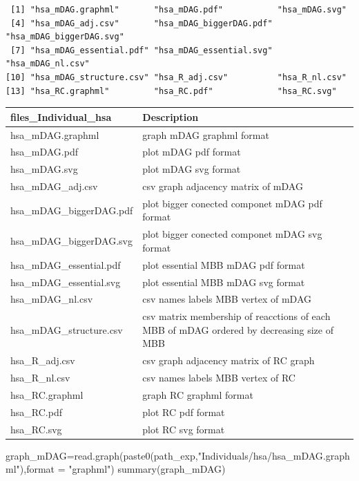\documentclass[
  letterpaper,
  DIV=11,
  numbers=noendperiod]{scrreprt}
\newenvironment{Shaded}{\begin{snugshade}}{\end{snugshade}}
\newcommand{\AttributeTok}[1]{\textcolor[rgb]{0.40,0.45,0.13}{#1}}
\newcommand{\FunctionTok}[1]{\textcolor[rgb]{0.28,0.35,0.67}{#1}}
\newcommand{\NormalTok}[1]{\textcolor[rgb]{0.00,0.23,0.31}{#1}}
\newcommand{\OtherTok}[1]{\textcolor[rgb]{0.00,0.23,0.31}{#1}}
\newcommand{\StringTok}[1]{\textcolor[rgb]{0.13,0.47,0.30}{#1}}
\begin{document}
\begin{verbatim}
 [1] "hsa_mDAG.graphml"       "hsa_mDAG.pdf"           "hsa_mDAG.svg"          
 [4] "hsa_mDAG_adj.csv"       "hsa_mDAG_biggerDAG.pdf" "hsa_mDAG_biggerDAG.svg"
 [7] "hsa_mDAG_essential.pdf" "hsa_mDAG_essential.svg" "hsa_mDAG_nl.csv"       
[10] "hsa_mDAG_structure.csv" "hsa_R_adj.csv"          "hsa_R_nl.csv"          
[13] "hsa_RC.graphml"         "hsa_RC.pdf"             "hsa_RC.svg"            
\end{verbatim}

\begin{tabular}{l|l}
\hline
files\_Individual\_hsa & Description\\
\hline
hsa\_mDAG.graphml & graph mDAG graphml format\\
\hline
hsa\_mDAG.pdf & plot mDAG pdf format\\
\hline
hsa\_mDAG.svg & plot mDAG svg format\\
\hline
hsa\_mDAG\_adj.csv & csv graph adjacency matrix of mDAG\\
\hline
hsa\_mDAG\_biggerDAG.pdf & plot bigger conected componet mDAG pdf format\\
\hline
hsa\_mDAG\_biggerDAG.svg & plot bigger conected componet mDAG svg format\\
\hline
hsa\_mDAG\_essential.pdf & plot essential MBB mDAG pdf format\\
\hline
hsa\_mDAG\_essential.svg & plot essential MBB mDAG svg format\\
\hline
hsa\_mDAG\_nl.csv & csv names labels MBB vertex of mDAG\\
\hline
hsa\_mDAG\_structure.csv & csv matrix membership of reacctions of each MBB of mDAG ordered by decreasing size of MBB\\
\hline
hsa\_R\_adj.csv & csv graph adjacency matrix of RC graph\\
\hline
hsa\_R\_nl.csv & csv names labels MBB vertex of RC\\
\hline
hsa\_RC.graphml & graph RC graphml format\\
\hline
hsa\_RC.pdf & plot RC pdf format\\
\hline
hsa\_RC.svg & plot RC svg format\\
\hline
\end{tabular}

\begin{Shaded}
\begin{Highlighting}[]
\NormalTok{graph\_mDAG}\OtherTok{=}\FunctionTok{read.graph}\NormalTok{(}\FunctionTok{paste0}\NormalTok{(path\_exp,}\StringTok{"Individuals/hsa/hsa\_mDAG.graphml"}\NormalTok{),}\AttributeTok{format =} \StringTok{"graphml"}\NormalTok{)}
\FunctionTok{summary}\NormalTok{(graph\_mDAG)}
\end{Highlighting}
\end{Shaded}
\end{document}
